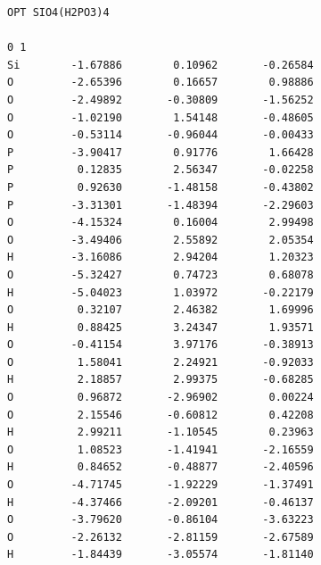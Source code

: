 \documentclass[
  digital, %
  table,   %
  lof,     %
  lot,     %
]{fithesis3}
\begin{document}
\begin{lstlisting}[frame=single, caption={\ce{SiO4(H2PO3)4}},label=DescriptiveLabel]
OPT SIO4(H2PO3)4

0 1
Si        -1.67886        0.10962       -0.26584
O         -2.65396        0.16657        0.98886
O         -2.49892       -0.30809       -1.56252
O         -1.02190        1.54148       -0.48605
O         -0.53114       -0.96044       -0.00433
P         -3.90417        0.91776        1.66428
P          0.12835        2.56347       -0.02258
P          0.92630       -1.48158       -0.43802
P         -3.31301       -1.48394       -2.29603
O         -4.15324        0.16004        2.99498
O         -3.49406        2.55892        2.05354
H         -3.16086        2.94204        1.20323
O         -5.32427        0.74723        0.68078
H         -5.04023        1.03972       -0.22179
O          0.32107        2.46382        1.69996
H          0.88425        3.24347        1.93571
O         -0.41154        3.97176       -0.38913
O          1.58041        2.24921       -0.92033
H          2.18857        2.99375       -0.68285
O          0.96872       -2.96902        0.00224
O          2.15546       -0.60812        0.42208
H          2.99211       -1.10545        0.23963
O          1.08523       -1.41941       -2.16559
H          0.84652       -0.48877       -2.40596
O         -4.71745       -1.92229       -1.37491
H         -4.37466       -2.09201       -0.46137
O         -3.79620       -0.86104       -3.63223
O         -2.26132       -2.81159       -2.67589
H         -1.84439       -3.05574       -1.81140
 \end{lstlisting}
\newpage
\end{document}
